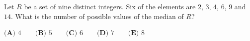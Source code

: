 Let $R$ be a set of nine distinct integers. Six of the elements are $2$, $3$, $4$, $6$, $9$ and $14$. What is the number of possible values of the median of $R$?

$\textbf{(A) }4\qquad\textbf{(B) }5\qquad\textbf{(C) }6\qquad\textbf{(D) }7\qquad\textbf{(E) }8$
